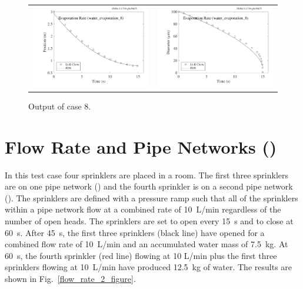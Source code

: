 \documentclass[11pt]{book}
\begin{document}
\begin{figure}[h!]
\noindent
\begin{tabular*}{\textwidth}{l@{\extracolsep{\fill}}r}
\includegraphics[width=3.2in]{SCRIPT_FIGURES/water_evaporation_8_z} &
\includegraphics[width=3.2in]{SCRIPT_FIGURES/water_evaporation_8_d}
\end{tabular*}
\caption[Sample case ]{Output of  case 8.}
\label{water_evaporation_8_plots}
\end{figure}

\clearpage

\section{Flow Rate and Pipe Networks (\texorpdfstring{{}}{flow\_rate\_2}) }
\label{flow_rate_2}

In this test case four sprinklers are placed in a room.  The first three sprinklers are on one pipe network () and the fourth sprinkler is on a second pipe network ().  The sprinklers are defined with a pressure ramp such that all of the sprinklers within a pipe network flow at a combined rate of 10~L/min regardless of the number of open heads.  The sprinklers are set to open every 15~s and to close at 60~s.  After 45~s, the first three sprinklers (black line) have opened for a combined flow rate of 10~L/min and an accumulated water mass of 7.5~kg.  At 60~s, the fourth sprinkler (red line) flowing at 10 L/min plus the first three sprinklers flowing at 10~L/min have produced 12.5~kg of water. The results are shown in Fig.~\ref{flow_rate_2_figure}.
\end{document}
